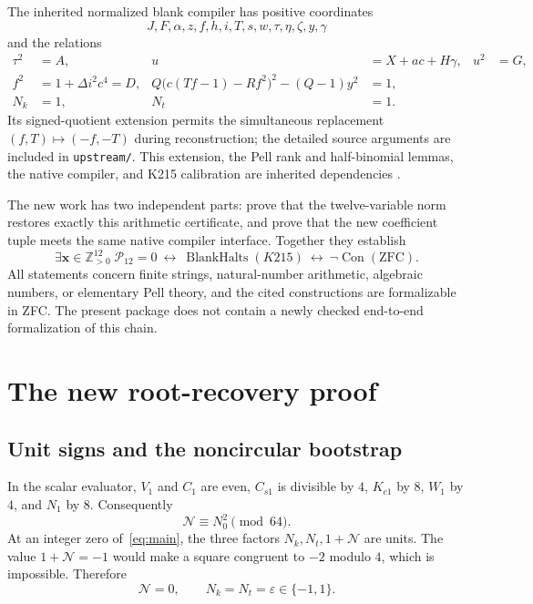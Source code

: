 \documentclass[11pt,a4paper]{article}
\theoremstyle{remark}\newtheorem{remark}[theorem]{Remark}
\newcommand{\PP}{\mathbb Z_{>0}}
\newcommand{\Con}{\operatorname{Con}}
\newcommand{\ZFC}{\mathrm{ZFC}}
\begin{document}
The inherited normalized blank compiler has positive coordinates
\[
 J,F,\alpha,z,f,h,i,T,s,w,\tau,\eta,\zeta,y,\gamma
\]
and the relations
\begin{align*}
 \tau^2&=A,&u&=X+ac+H\gamma,&u^2&=G,\\
 f^2&=1+\Delta i^2c^4=D,&
 Q\bigl(c(Tf-1)-Rf^2\bigr)^2-(Q-1)y^2&=1,\\
 N_k&=1,&N_t&=1.
\end{align*}
Its signed-quotient extension permits the simultaneous replacement
$(f,T)\mapsto(-f,-T)$ during reconstruction; the detailed source
arguments are included in \texttt{upstream/}. This extension, the Pell
rank and half-binomial lemmas, the native compiler, and K215 calibration
are inherited dependencies \cite{blank67,root20,root09,helical}.

The new work has two independent parts: prove that the twelve-variable
norm restores exactly this arithmetic certificate, and prove that the
new coefficient tuple meets the same native compiler interface.
Together they establish
\[
 \exists\mathbf x\in\PP^{12}\;\mathcal P_{12}=0
 \ \longleftrightarrow\ \operatorname{BlankHalts}(K215)
 \ \longleftrightarrow\ \neg\Con(\ZFC).
\]
All statements concern finite strings, natural-number arithmetic, algebraic
numbers, or elementary Pell theory, and the cited constructions are
formalizable in ZFC. The present package does not contain a newly checked
end-to-end formalization of this chain.

\section{The new root-recovery proof}
\label{sec:roots}

\subsection{Unit signs and the noncircular bootstrap}

In the scalar evaluator, $V_1$ and $C_1$ are even, $C_{s1}$ is divisible
by $4$, $K_{c1}$ by $8$, $W_1$ by $4$, and $N_1$ by $8$.
Consequently
\[
 \mathcal N\equiv N_0^2\pmod{64}.
\]
At an integer zero of~\eqref{eq:main}, the three factors
$N_k,N_t,1+\mathcal N$ are units. The value $1+\mathcal N=-1$ would
make a square congruent to $-2$ modulo $4$, which is impossible.
Therefore
\begin{equation}
 \mathcal N=0,\qquad N_k=N_t=\varepsilon\in\{-1,1\}.
 \label{eq:units}
\end{equation}
\end{document}
